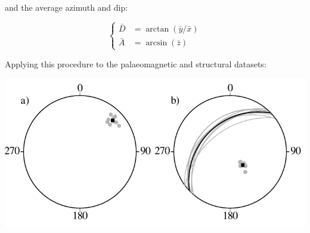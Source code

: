 \noindent and the average azimuth and dip:

\begin{equation}
  \left\{
  \begin{split}
    \bar{D} & = \arctan\left(\bar{y}/\bar{x}\right)\\
    \bar{A} & = \arcsin\left(\bar{z}\right)
  \end{split}
  \right.
\end{equation}

Applying this procedure to the palaeomagnetic and structural datasets:

\noindent\begin{minipage}[t][][b]{.6\textwidth}
\includegraphics[width=\textwidth]{../figures/sphericalmean.pdf}
\end{minipage}
\begin{minipage}[t][][t]{.4\textwidth}
  \label{fig:sphericalmean}
\end{minipage}

